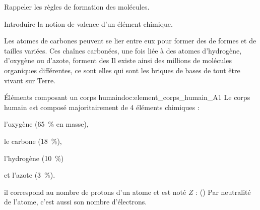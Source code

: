 \tetePremStssOrga

\vspace*{-30pt}


\begin{objectifs}
  \item Rappeler les règles de formation des molécules.
  \item Introduire la notion de valence d'un élément chimique.
\end{objectifs}

\begin{contexte}
  Les atomes de carbones peuvent se lier entre eux pour former des  de formes et de tailles variées.
  Ces chaînes carbonées, une fois liée à des atomes d'hydrogène, d'oxygène ou d'azote, forment des 
  Il existe ainsi des millions de molécules organiques différentes, ce sont elles qui sont les briques de bases de tout être vivant sur Terre.

\end{contexte}


\begin{doc}{Éléments composant un corps humain}{doc:element_corps_humain_A1}
  Le corps humain est composé majoritairement de 4 éléments chimiques :
  \vspace*{-4pt}
  \begin{multicols}{2}
  \begin{listePoints}
    \item l'oxygène    (\qty{65}{\percent} en masse),
    \item le carbone   (\qty{18}{\percent}),
    \item l'hydrogène  (\qty{10}{\percent})
    \item et l'azote   (\qty{3}{\percent}).
  \end{listePoints}
  \end{multicols}
  
  \begin{importants}
     il correspond au nombre de protons d'un atome et est noté $Z$ :  (\hspace{-8pt}\exemple {})
    Par neutralité de l'atome, c'est aussi son nombre d'électrons.
  \end{importants}
\end{doc}


